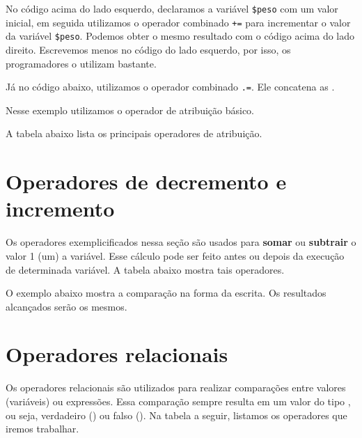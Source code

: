 No código acima do lado esquerdo, declaramos a variável \texttt{\$peso} com um valor inicial,
em seguida utilizamos o operador combinado \texttt{+=} para incrementar o valor da
variável \texttt{\$peso}. Podemos obter o mesmo resultado com o código acima do lado direito.
Escrevemos menos no código do lado esquerdo, por isso, os programadores o utilizam bastante.

Já no código abaixo, utilizamos o operador combinado \texttt{.=}. Ele concatena as \tipostrings.



Nesse exemplo utilizamos o operador de atribuição básico.



A tabela abaixo lista os principais operadores de atribuição. 



\section{Operadores de decremento e incremento}
\label{operadores-de-decremento-e-incremento}

Os operadores exemplicificados nessa seção são usados para \textbf{somar} ou \textbf{subtrair}
o valor 1 (um) a variável. Esse cálculo pode ser feito antes ou depois da execução de 
determinada variável. A tabela abaixo mostra tais operadores.



O exemplo abaixo mostra a comparação na forma da escrita. Os resultados alcançados serão
os mesmos.



\section{Operadores relacionais}
\label{operadores-relacionais}

Os operadores relacionais são utilizados para realizar comparações entre valores (variáveis)
ou expressões. Essa comparação sempre resulta em um valor do tipo \booleano, ou seja,
verdadeiro (\true) ou falso (\false). Na tabela a seguir, listamos os operadores
que iremos trabalhar.

